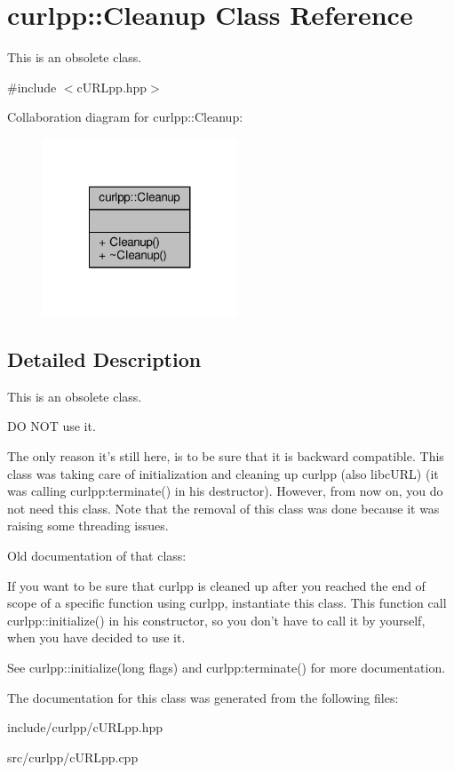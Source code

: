 \hypertarget{classcurlpp_1_1Cleanup}{\section{curlpp\-:\-:Cleanup Class Reference}
\label{classcurlpp_1_1Cleanup}
}


This is an obsolete class.  




{\ttfamily \#include $<$c\-U\-R\-Lpp.\-hpp$>$}



Collaboration diagram for curlpp\-:\-:Cleanup\-:\nopagebreak
\begin{figure}[H]
\begin{center}
\leavevmode
\includegraphics[width=164pt]{classcurlpp_1_1Cleanup__coll__graph}
\end{center}
\end{figure}


\subsection{Detailed Description}
This is an obsolete class. 

D\-O N\-O\-T use it.

The only reason it's still here, is to be sure that it is backward compatible. This class was taking care of initialization and cleaning up curlpp (also libc\-U\-R\-L) (it was calling curlpp\-:terminate() in his destructor). However, from now on, you do not need this class. Note that the removal of this class was done because it was raising some threading issues.

Old documentation of that class\-:

If you want to be sure that curlpp is cleaned up after you reached the end of scope of a specific function using curlpp, instantiate this class. This function call curlpp\-::initialize() in his constructor, so you don't have to call it by yourself, when you have decided to use it.

See curlpp\-::initialize(long flags) and curlpp\-:terminate() for more documentation. 

The documentation for this class was generated from the following files\-:\begin{DoxyCompactItemize}
\item 
include/curlpp/c\-U\-R\-Lpp.\-hpp\item 
src/curlpp/c\-U\-R\-Lpp.\-cpp\end{DoxyCompactItemize}

